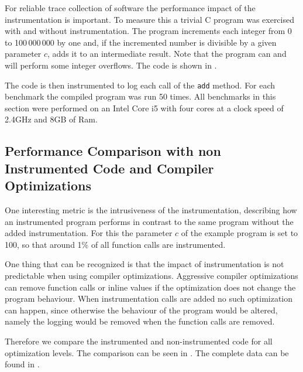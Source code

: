 For reliable trace collection of software the performance impact of the instrumentation is important.
To measure this a trivial C program was exercised with and without instrumentation.
The program increments each integer from 0 to 100\,000\,000 by one and, if the incremented number is divisible by a given parameter \(c\), adds it to an intermediate result.
Note that the program  can and will perform some integer overflows.
The code is shown in .

The code is then instrumented to log each call of the \lstinline{add} method.
For each benchmark the compiled program was run 50 times.
All benchmarks in this section were performed on an Intel Core i5 with four cores at a clock speed of 2.4GHz and 8GB of Ram.

\begin{figure}[!hb]

\end{figure}


\subsection{Performance Comparison with non Instrumented Code and Compiler Optimizations}
\label{sec:evaluation:instrumentation_benchmark:instr_vs_non_inst}

One interesting metric is the intrusiveness of the instrumentation, describing how an instrumented program performs in contrast to the same program without the added instrumentation.
For this the parameter \(c\) of the example program is set to 100, so that around 1\% of all function calls are instrumented.

One thing that can be recognized is that the impact of instrumentation is not predictable when using compiler optimizations.
Aggressive compiler optimizations can remove function calls or inline values if the optimization does not change the program behaviour.
When instrumentation calls are added no such optimization can happen, since otherwise the behaviour of the program would be altered, namely the logging would be removed when the function calls are removed.

Therefore we compare the instrumented and non-instrumented code for all optimization levels.
The comparison can be seen in .
The complete data can be found in .

